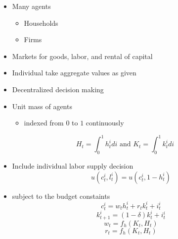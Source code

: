 \documentclass[notes=show]{beamer}
\begin{document}
\begin{frame}%


\begin{itemize}
\item Many agents

\begin{itemize}
\item Households

\item Firms
\end{itemize}

\item Markets for goods, labor, and rental of capital

\item Individual take aggregate values as given

\item Decentralized decision making
\end{itemize}

\end{frame}%

\begin{frame}%


\begin{itemize}
\item Unit mass of agents

\begin{itemize}
\item indexed from $0$ to $1$ continuously
\end{itemize}
\end{itemize}

\[
H_t=\int_0^1h_t^idi\text{ and }K_t=\int_0^1k_t^idi 
\]

\begin{itemize}
\item Include individual labor supply decision%
\[
u\left( c_{t}^{i},l_{t}^{i}\right) =u\left( c_{t}^{i},1-h_{t}^{i}\right) 
\]

\item subject to the budget constaints 
\[
c_{t}^{i}=w_{t}h_{t}^{i}+r_{t}k_{t}^{i}+i_{t}^{i} 
\]%
\[
k_{t+1}^{i}=\left( 1-\delta \right) k_{t}^{i}+i_{t}^{i} 
\]%
\[
w_{t}=f_{h}\left( K_{t},H_{t}\right) 
\]%
\[
r_{t}=f_{h}\left( K_{t},H_{t}\right) 
\]
\end{itemize}

\end{frame}%
\end{document}
